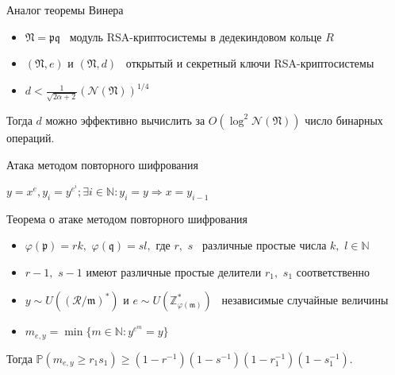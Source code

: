 \documentclass[8pt, xcolor=x11names]{beamer}
\begin{document}
\begin{frame}
    \begin{block}{Аналог теоремы Винера}
        \begin{itemize}
            \item $\mathfrak{N} = \mathfrak{p}\mathfrak{q}$ \textendash\ модуль RSA-криптосистемы в дедекиндовом кольце $R$
            
            \item $(\mathfrak{N}, e)$ и $(\mathfrak{N}, d)$ \textendash\ открытый и секретный ключи RSA-криптосистемы
            
            \item $d < \frac{1}{\sqrt{2\alpha+2}}(\mathcal{N}(\mathfrak{N}))^{1/4}$
        \end{itemize}
        Тогда $d$ можно эффективно вычислить за $O(\log^2 \mathcal{N}(\mathfrak{N}))$ число бинарных операций.
    \end{block}
    
    \begin{block}{Атака методом повторного шифрования}
        \begin{center}
            $y=x^e, y_i=y^{e^i}; \exists i \in \mathbb{N}: y_i=y \Rightarrow x=y_{i-1}$
        \end{center}
    \end{block}
    
    \begin{block}{Теорема о атаке методом повторного шифрования}
        \begin{itemize}
            \item $\varphi(\mathfrak{p})=rk,$ $\varphi(\mathfrak{q})=sl,$ где $r,$ $s$ \textendash\ различные простые числа $k,$ $l \in \mathbb{N}$
            
            \item $r-1,$ $s-1$ имеют различные простые делители $r_1,$ $s_1$ соответственно
            
            \item $y \sim U\left((\mathcal{R}/\mathfrak{m})^*\right)$ и $e \sim U\left(\mathbb{Z}_{\varphi(\mathfrak{m})}^*\right)$ \textendash\ независимые случайные величины
            
            \item $m_{e,y}=\min\{m \in \mathbb{N}: y^{e^m}= y\}$
        \end{itemize}
        Тогда
        $
            \mathbb{P}\left(
                m_{e,y} \ge r_1s_1
            \right) \ge \left(
                1-r^{-1}
            \right)\left(
                1-s^{-1}
            \right)\left(
                1-r_1^{-1}
            \right)\left(
                1-s_1^{-1}
            \right).
        $
    \end{block}
\end{frame}
\end{document}
